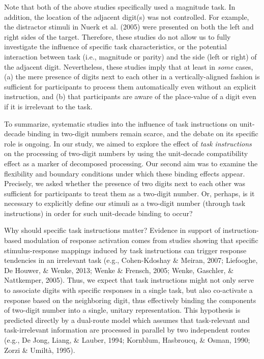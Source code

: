 \documentclass[english,man]{apa6}
\theoremstyle{definition}
\theoremstyle{definition}
\theoremstyle{definition}
\theoremstyle{remark}
\begin{document}
Note that both of the above studies specifically used a magnitude task.
In addition, the location of the adjacent digit(s) was not controlled.
For example, the distractor stimuli in Nuerk et al. (2005) were
presented on both the left and right sides of the target. Therefore,
these studies do not allow us to fully investigate the influence of
specific task characteristics, or the potential interaction between task
(i.e., magnitude or parity) and the side (left or right) of the adjacent
digit. Nevertheless, these studies imply that at least in \emph{some}
cases, (a) the mere presence of digits next to each other in a
vertically-aligned fashion is sufficient for participants to process
them automatically even without an explicit instruction, and (b) that
participants are aware of the place-value of a digit even if it is
irrelevant to the task.

To summarize, systematic studies into the influence of task instructions
on unit-decade binding in two-digit numbers remain scarce, and the
debate on its specific role is ongoing. In our study, we aimed to
explore the effect of \emph{task instructions} on the processing of
two-digit numbers by using the unit-decade compatibility effect as a
marker of decomposed processing. Our second aim was to examine the
flexibility and boundary conditions under which these binding effects
appear. Precisely, we asked whether the presence of two digits next to
each other was sufficient for participants to treat them as a two-digit
number. Or, perhaps, is it necessary to explicitly define our stimuli as
a two-digit number (through task instructions) in order for such
unit-decade binding to occur?

Why should specific task instructions matter? Evidence in support of
instruction-based modulation of response activation comes from studies
showing that specific stimulus-response mappings induced by task
instructions can trigger response tendencies in an irrelevant task
(e.g., Cohen-Kdoshay \& Meiran, 2007; Liefooghe, De Houwer, \& Wenke,
2013; Wenke \& Frensch, 2005; Wenke, Gaschler, \& Nattkemper, 2005).
Thus, we expect that task instructions might not only serve to associate
digits with specific responses in a single task, but also co-activate a
response based on the neighboring digit, thus effectively binding the
components of two-digit number into a single, unitary representation.
This hypothesis is predicted directly by a dual-route model which
assumes that task-relevant and task-irrelevant information are processed
in parallel by two independent routes (e.g., De Jong, Liang, \& Lauber,
1994; Kornblum, Hasbroucq, \& Osman, 1990; Zorzi \& Umiltà, 1995).
\end{document}
